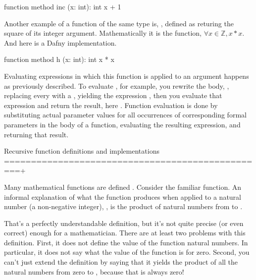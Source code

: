 \documentclass[letterpaper,10pt,english]{sphinxmanual}
\begin{document}
\begin{sphinxVerbatim}[commandchars=\\\{\}]
function method inc (x: int): int \PYGZob{} x + 1 \PYGZcb{}
\end{sphinxVerbatim}

Another example of a function of the same type is, , defined
as returing the square of its integer argument. Mathematically it is
the function, \(\forall x \in {\mathbb Z}, x * x\). And here is
a Dafny implementation.

\begin{sphinxVerbatim}[commandchars=\\\{\}]
function method h (x: int): int \PYGZob{} x * x \PYGZcb{}
\end{sphinxVerbatim}

Evaluating expressions in which this function is applied to an
argument happens as previously described. To evaluate , for
example, you rewrite the body, , replacing every  with a
, yielding the expression , then you evaluate that
expression and return the result, here . Function evaluation is
done by substituting actual parameter values for all occurrences of
corresponding formal parameters in the body of a function, evaluating
the resulting expression, and returning that result.

Recursive function definitions and implementations
=================================================+

Many mathematical functions are defined . Consider the
familiar  function. An informal explanation of what the
function produces when applied to a natural number (a non-negative
integer), , is the product of natural numbers from  to .

That’s a perfectly understandable definition, but it’s not quite
precise (or even correct) enough for a mathematician. There are at
least two problems with this definition. First, it does not define the
value of the function  natural numbers. In particular, it
does not say what the value of the function is for zero. Second, you
can’t just extend the definition by saying that it yields the product
of all the natural numbers from zero to , because that is always
zero!
\end{document}
